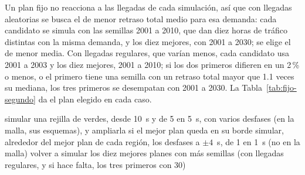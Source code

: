 Un plan fijo no reacciona a las llegadas de cada simulación, así que
con llegadas aleatorias se busca el de menor retraso total medio para
esa demanda: cada candidato se simula con las semillas 2001 a 2010, que
dan diez horas de tráfico distintas con la misma demanda, y los diez
mejores, con 2001 a 2030; se elige el de menor media. Con llegadas
regulares, que varían menos, cada candidato usa 2001 a 2003 y los diez
mejores, 2001 a 2010; si los dos primeros difieren en un 2\,\% o menos,
o el primero tiene una semilla con un retraso total mayor que 1.1 veces
su mediana, los tres primeros se desempatan con 2001 a 2030. La
Tabla~\ref{tab:fijo-segundo} da el plan elegido en cada caso.

\begin{algorithm}[H]
\small
\caption[Fijo ajustado al segundo]{Fijo ajustado al segundo de un caso del segundo estudio}
\label{alg:fijo-segundo}
simular una rejilla de verdes, desde 10~s y de 5 en 5~s, con varios desfases (en la malla, sus esquemas), y ampliarla si el mejor plan queda en su borde\;
simular, alrededor del mejor plan de cada región, los desfases a $\pm 4$~s, de 1 en 1~s (no en la malla)\;
volver a simular los diez mejores planes con más semillas (con llegadas regulares, y si hace falta, los tres primeros con 30)\;
\end{algorithm}

